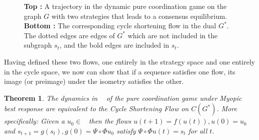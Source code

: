 \documentclass{article}
\newtheorem{theorem}{Theorem}[section]
\DeclareMathOperator{\At}{\mathcal{A}_{G}^{(2)}}
\begin{document}
\begin{figure}
{}
    \caption[Subgraph shortening to consensus]{\textbf{Top :} A trajectory in the dynamic pure coordination game on the graph $G$ with two strategies that leads to a consensus equilibrium. \textbf{Bottom :} The corresponding cycle shortening flow in the dual $G^*$. The dotted edges are edges of $G^*$ which are not included in the subgraph $s_t$, and the bold edges are included in $s_t$.}
    \label{fig:SubgraphShortenningConsensus}
\end{figure}
    
Having defined these two flows, one entirely in the strategy space and one entirely in the cycle space, we now can show that if a sequence satisfies one flow, its image (or preimage) under the isometry satisfies the other. 

\begin{theorem}\label{thm:csfEquiv}
    The dynamics in $\At$ of the pure coordination game under Myopic best response are equivalent to the Cycle Shortening Flow on $C(G^*)$. More specifically:  Given a $u_0\in \At$ then the flows $u(t+1)=f(u(t)), u(0)=u_0$ and $s_{t+1}=g(s_t), g(0)=\Psi\circ\Phi u_0$ satisfy $\Psi\circ\Phi u(t)=s_t$ for all $t$.
\end{theorem}
\end{document}
